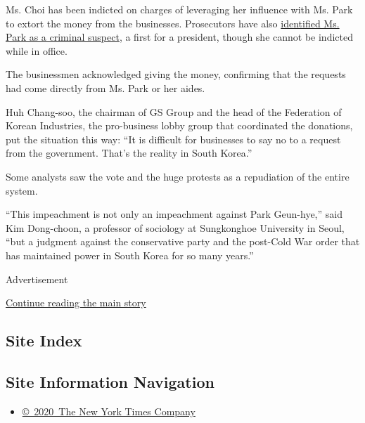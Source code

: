 Ms. Choi has been indicted on charges of leveraging her influence with
Ms. Park to extort the money from the businesses. Prosecutors have also
\href{http://www.nytimes3xbfgragh.onion/2016/11/20/world/asia/park-geun-hye-south-korea-extortion-accomplice-prosecutors.html}{identified
Ms. Park as a criminal suspect}, a first for a president, though she
cannot be indicted while in office.

The businessmen acknowledged giving the money, confirming that the
requests had come directly from Ms. Park or her aides.

Huh Chang-soo, the chairman of GS Group and the head of the Federation
of Korean Industries, the pro-business lobby group that coordinated the
donations, put the situation this way: ``It is difficult for businesses
to say no to a request from the government. That's the reality in South
Korea.''

Some analysts saw the vote and the huge protests as a repudiation of the
entire system.

``This impeachment is not only an impeachment against Park Geun-hye,''
said Kim Dong-choon, a professor of sociology at Sungkonghoe University
in Seoul, ``but a judgment against the conservative party and the
post-Cold War order that has maintained power in South Korea for so many
years.''

Advertisement

\protect\hyperlink{after-bottom}{Continue reading the main story}

\hypertarget{site-index}{%
\subsection{Site Index}\label{site-index}}

\hypertarget{site-information-navigation}{%
\subsection{Site Information
Navigation}\label{site-information-navigation}}

\begin{itemize}
\tightlist
\item
  \href{https://help.nytimes3xbfgragh.onion/hc/en-us/articles/115014792127-Copyright-notice}{©~2020~The
  New York Times Company}
\end{itemize}

